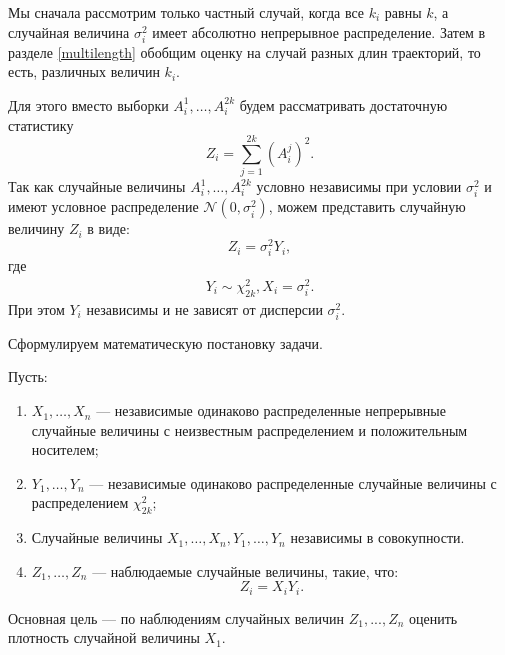 \documentclass[../paper.tex]{subfiles}
\begin{document}
Мы сначала рассмотрим только частный случай,
когда все $k_i$ равны $k$, а случайная величина $\sigma_i^2$ имеет абсолютно непрерывное распределение.
Затем в разделе \ref{multilength} обобщим оценку на случай разных длин траекторий, то есть, различных величин $k_i$.

Для этого вместо выборки $A_i^1, \dots, A_i^{2k}$ будем рассматривать
достаточную статистику 
\[
	Z_i = \sum\limits_{j=1}^{2k} \left(A_i^j\right)^2
.\]
Так как случайные величины $A_i^1, \dots, A_i^{2k}$ условно независимы при условии $\sigma_i^2$ и имеют условное
распределение $\mathcal{N}\left(0, \sigma_i^2\right)$, можем представить случайную величину $Z_i$ в виде:
\[
Z_i = \sigma_i^2 Y_i,
\]
где 
\begin{align*}
	Y_i \sim \chi^2_{2k},
	X_i = \sigma_i^2
.\end{align*}
При этом $Y_i$ независимы и не зависят от дисперсии $\sigma_i^2$.

Сформулируем математическую постановку задачи.

\begin{Probl}
	Пусть:
	\begin{enumerate}
		\item $X_1, \dots, X_n$ --- независимые одинаково распределенные непрерывные случайные величины
			с неизвестным распределением и положительным носителем; 
		\item $Y_1, \dots, Y_n$ --- независимые одинаково распределенные случайные величины с распределением $\chi^2_{2k}$;
		\item Случайные величины $X_1, \dots, X_n, Y_1, \dots, Y_n$ независимы в совокупности.
		\item $Z_1, \dots, Z_n$ --- наблюдаемые случайные величины, такие, что:
			\[
				Z_i = X_i Y_i
			.\]
	\end{enumerate}
	Основная цель --- по наблюдениям случайных величин $Z_1, ..., Z_n$ оценить плотность случайной величины $X_1$.
\end{Probl}
\end{document}
